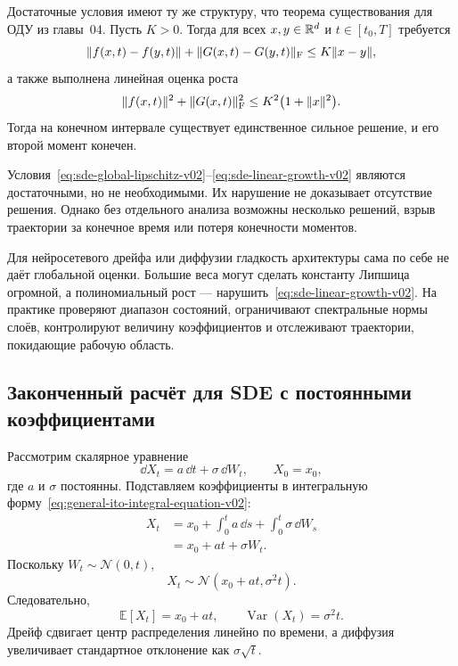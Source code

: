 Достаточные условия имеют ту же структуру, что теорема существования для ОДУ из главы~04. Пусть $K>0$. Тогда для всех $x,y\in\mathbb{R}^d$ и $t\in[t_0,T]$ требуется
\begin{equation}
\label{eq:sde-global-lipschitz-v02}
\lVert f(x,t)-f(y,t)\rVert
+
\lVert G(x,t)-G(y,t)\rVert_{\mathrm F}
\leq
K\lVert x-y\rVert,
\end{equation}
а также выполнена линейная оценка роста
\begin{equation}
\label{eq:sde-linear-growth-v02}
\lVert f(x,t)\rVert^2
+
\lVert G(x,t)\rVert_{\mathrm F}^2
\leq
K^2\bigl(1+\lVert x\rVert^2\bigr).
\end{equation}
Тогда на конечном интервале существует единственное сильное решение, и его второй момент конечен.

Условия~\eqref{eq:sde-global-lipschitz-v02}--\eqref{eq:sde-linear-growth-v02} являются достаточными, но не необходимыми. Их нарушение не доказывает отсутствие решения. Однако без отдельного анализа возможны несколько решений, взрыв траектории за конечное время или потеря конечности моментов.

Для нейросетевого дрейфа или диффузии гладкость архитектуры сама по себе не даёт глобальной оценки. Большие веса могут сделать константу Липшица огромной, а полиномиальный рост --- нарушить~\eqref{eq:sde-linear-growth-v02}. На практике проверяют диапазон состояний, ограничивают спектральные нормы слоёв, контролируют величину коэффициентов и отслеживают траектории, покидающие рабочую область.

\subsection{Законченный расчёт для SDE с постоянными коэффициентами}

Рассмотрим скалярное уравнение
\begin{equation}
\label{eq:additive-sde-v02}
\dd X_t
=
a\,\dd t
+
\sigma\,\dd W_t,
\qquad
X_0=x_0,
\end{equation}
где $a$ и $\sigma$ постоянны. Подставляем коэффициенты в интегральную форму~\eqref{eq:general-ito-integral-equation-v02}:
\begin{align}
X_t
&=
x_0
+
\int_0^t a\,\dd s
+
\int_0^t \sigma\,\dd W_s
\\
&=
x_0+at+\sigma W_t.
\label{eq:additive-sde-solution-v02}
\end{align}
Поскольку $W_t\sim\mathcal N(0,t)$,
\begin{equation}
\label{eq:additive-sde-distribution-v02}
X_t
\sim
\mathcal N\!\left(x_0+at,\sigma^2t\right).
\end{equation}
Следовательно,
\begin{equation}
\label{eq:additive-sde-moments-v02}
\mathbb E[X_t]=x_0+at,
\qquad
\operatorname{Var}(X_t)=\sigma^2t.
\end{equation}
Дрейф сдвигает центр распределения линейно по времени, а диффузия увеличивает стандартное отклонение как $\sigma\sqrt t$.

